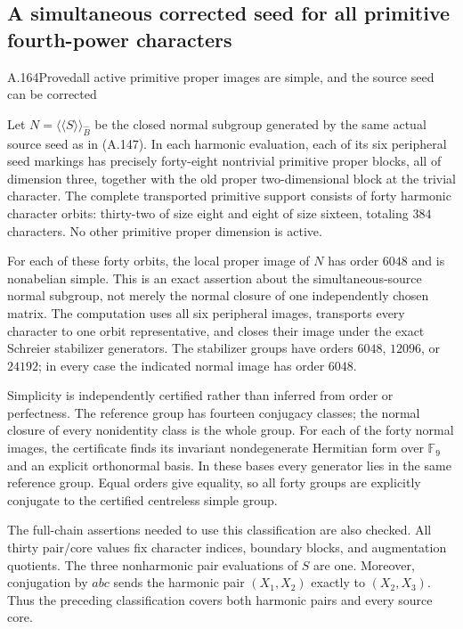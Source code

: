 \subsection{A simultaneous corrected seed for all primitive fourth-power characters}


\begin{statement}{A.164}{Proved}{all active primitive proper images are simple, and the source seed can be corrected}
\end{statement}
Let $N=\langle\!\langle S\rangle\!\rangle_{\widehat B}$ be the
closed normal subgroup generated by the same actual source seed as
in (A.147). In each harmonic evaluation, each of its six peripheral
seed markings has precisely forty-eight nontrivial primitive proper
blocks, all of dimension three, together with the old proper
two-dimensional block at the trivial character. The complete
transported primitive support consists of forty harmonic character
orbits: thirty-two of size eight and eight of size sixteen, totaling
$384$ characters. No other primitive proper dimension is active.

For each of these forty orbits, the local proper image of $N$ has
order $6048$ and is nonabelian simple. This is an exact assertion
about the simultaneous-source normal subgroup, not merely the
normal closure of one independently chosen matrix. The computation
uses all six peripheral images, transports every character to one
orbit representative, and closes their image under the exact
Schreier stabilizer generators. The stabilizer groups have orders
$6048$, $12096$, or $24192$; in every case the indicated normal
image has order $6048$.

Simplicity is independently certified rather than inferred from
order or perfectness. The reference group has fourteen conjugacy
classes; the normal closure of every nonidentity class is the
whole group. For each of the forty normal images, the certificate
finds its invariant nondegenerate Hermitian form over $\mathbb F_9$
and an explicit orthonormal basis. In these bases every generator
lies in the same reference group. Equal orders give equality,
so all forty groups are explicitly conjugate to the certified
centreless simple group.

The full-chain assertions needed to use this classification are
also checked. All thirty pair/core values fix character indices,
boundary blocks, and augmentation quotients. The three nonharmonic
pair evaluations of $S$ are one. Moreover, conjugation by $abc$
sends the harmonic pair $(X_1,X_2)$ exactly to $(X_2,X_3)$.
Thus the preceding classification covers both harmonic pairs and
every source core.

